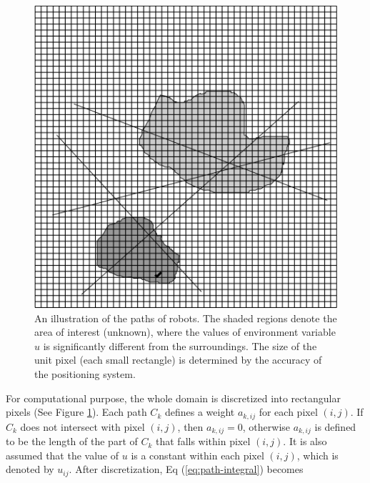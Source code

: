 \documentclass[english]{article}\usepackage[]{graphicx}\usepackage[]{color}
\begin{document}
\begin{figure}[h]
\begin{centering}

\includegraphics[width=0.5\linewidth]{figures/path-illustration}
\par\end{centering}

\caption{\label{fig:An-illustration-of-paths}An illustration of the paths
of robots. The shaded regions denote the area of interest (unknown),
where the values of environment variable $u$ is significantly different
from the surroundings. The size of the unit pixel (each small rectangle)
is determined by the accuracy of the positioning system.}
\end{figure}


For computational purpose, the whole domain is discretized into rectangular
pixels (See Figure \ref{fig:An-illustration-of-paths}). Each path
$C_{k}$ defines a weight $a_{k,ij}$ for each pixel $(i,j)$. If
$C_{k}$ does not intersect with pixel $(i,j)$, then $a_{k,ij}=0$,
otherwise $a_{k,ij}$ is defined to be the length
of the part of $C_{k}$ that falls within pixel $(i,j)$. It is also
assumed that the value of $u$ is a constant within each pixel $(i,j)$,
which is denoted by $u_{ij}$. After discretization, Eq (\ref{eq:path-integral})
becomes
\end{document}
